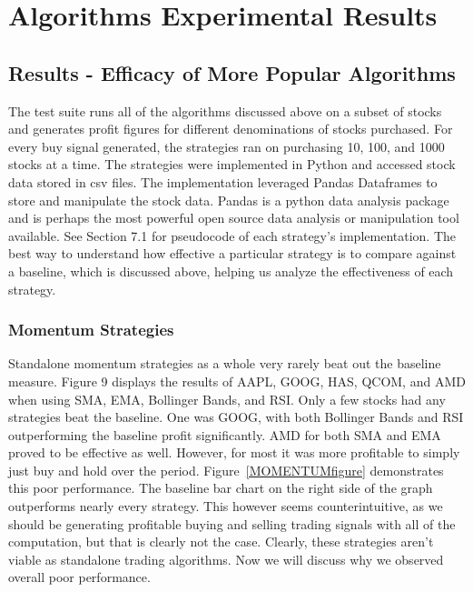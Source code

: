 \documentclass[../thesis.tex]{subfiles}
\begin{document}
\chapter{Algorithms Experimental Results}
\label{ch:experimentsalgos}

\section{Results - Efficacy of More Popular Algorithms}

The test suite runs all of the algorithms discussed above on a subset of stocks and generates profit figures for different denominations of stocks purchased. For every buy signal generated, the strategies ran on purchasing 10, 100, and 1000 stocks at a time. The strategies were implemented in Python and accessed stock data stored in csv files. The implementation leveraged Pandas Dataframes to store and manipulate the stock data. Pandas is a python data analysis package and is perhaps the most powerful open source data analysis or manipulation tool available. See Section 7.1 for pseudocode of each strategy's implementation.  The best way to understand how effective a particular strategy is to compare against a baseline, which is discussed above, helping us analyze the effectiveness of each strategy.   

\subsection{Momentum Strategies}

Standalone momentum strategies as a whole very rarely beat out the baseline measure. Figure 9 displays the results of AAPL, GOOG, HAS, QCOM, and AMD when using SMA, EMA, Bollinger Bands, and RSI. Only a few stocks had any strategies beat the baseline. One was GOOG, with both Bollinger Bands and RSI outperforming the baseline profit significantly. AMD for both SMA and EMA proved to be effective as well. However, for most it was more profitable to simply just buy and hold over the period. Figure~\ref{MOMENTUMfigure} demonstrates this poor performance. The baseline bar chart on the right side of the graph outperforms nearly every strategy. This however seems counterintuitive, as we should be generating profitable buying and selling trading signals with all of the computation, but that is clearly not the case.  Clearly, these strategies aren't viable as standalone trading algorithms. Now we will discuss why we observed overall poor performance.
\end{document}
